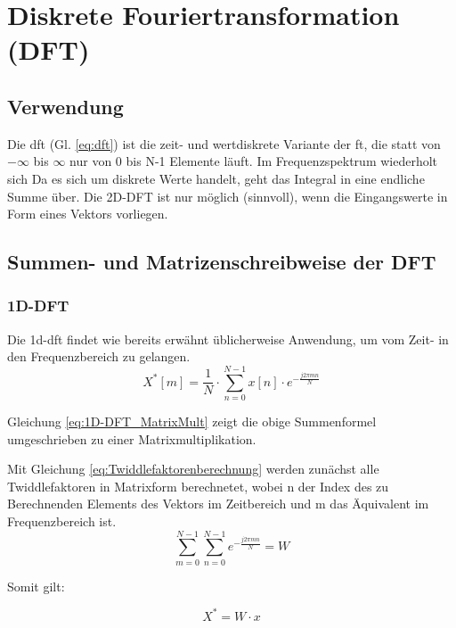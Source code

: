 \section{Diskrete Fouriertransformation (DFT)}




\subsection{Verwendung}

Die \gls{dft} (Gl. \ref{eq:dft}) ist die zeit- und wertdiskrete Variante der \gls{ft}, die statt von $-\infty$ bis $\infty$ nur von 0 bis N-1 Elemente läuft. 
Im Frequenzspektrum wiederholt sich 
Da es sich um diskrete Werte handelt, geht das Integral in eine endliche Summe über. Die 2D-DFT ist nur möglich (sinnvoll), wenn die Eingangswerte in Form eines Vektors vorliegen.


\subsection{Summen- und Matrizenschreibweise der DFT}
\subsubsection{1D-DFT}
Die \gls{1d-dft} findet wie bereits erwähnt üblicherweise Anwendung, um vom Zeit- in den Frequenzbereich zu gelangen.
\begin{equation}\label{eq:dft}
 X^* \left[ m \right] = \frac{1}{N} \cdot \sum^{N-1}_{n=0} x[n] \cdot e^{-\frac{j 2 \pi m n}{N}}
\end{equation}



Gleichung \ref{eq:1D-DFT_MatrixMult} zeigt die obige Summenformel umgeschrieben zu einer Matrixmultiplikation.

Mit Gleichung \ref{eq:Twiddlefaktorenberechnung} werden zunächst alle Twiddlefaktoren in Matrixform berechnetet, wobei n der Index des zu Berechnenden Elements des Vektors im Zeitbereich und
m das Äquivalent im Frequenzbereich ist.
\begin{equation}\label{eq:Twiddlefaktorenberechnung}
\sum^{N-1 }_{m=0} \sum^{N-1 }_{n=0} e^{-\frac{j 2 \pi m n}{N}} = W
\end{equation}

Somit gilt:

\begin{equation}\label{eq:1D-DFT_MatrixMult}
X^* = W \cdot x
\end{equation}


